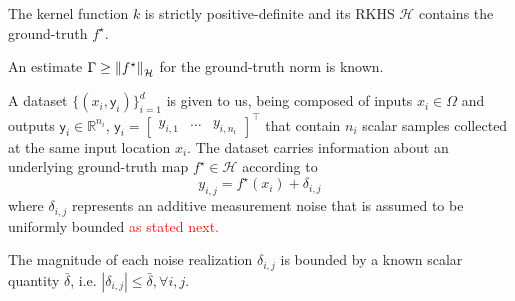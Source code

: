 \begin{assumption}
	\label{as:kernelRkhs}
	The kernel function $k$ is strictly positive-definite and its RKHS $\mathcal{H}$ contains the ground-truth $f^\star$.
\end{assumption}

\begin{assumption}
	An estimate $\Gamma \geq \left\| f^\star \right\|_\mathcal{H}$ for the ground-truth norm is known.
\end{assumption}

A dataset $\{(x_i,\mathsf{y}_i)\}_{i=1}^d$ is given to us, being composed of inputs $x_i \in \Omega$ and outputs $\mathsf{y}_i \in \mathbb{R}^{n_i}$, $\mathsf{y}_i = \begin{bmatrix}y_{i,1} & \dots & y_{i,n_i} \end{bmatrix}^\top$ that contain $n_i$ scalar samples collected at the same input location $x_i$. The dataset carries information about an underlying ground-truth map $f^\star \in \mathcal{H}$ according to
\begin{equation}
	y_{i,j} = f^\star(x_i) + \delta_{i,j}
\end{equation}
where $\delta_{i,j}$ represents an additive measurement noise that is assumed to be uniformly bounded \textcolor{red}{as stated next.}

\begin{assumption}
	\label{as:noisebound}
	The magnitude of each noise realization $\delta_{i,j}$ is bounded by a known scalar quantity $\bar{\delta}$, i.e. $|\delta_{i,j}| \leq \bar \delta, \forall i,j$.
\end{assumption}

